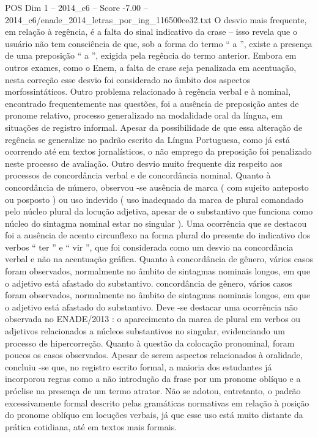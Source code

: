 \begin{textsample}{POS Dim 1 – 2014\_c6 – Score -7.00 – 2014\_c6/enade\_2014\_letras\_por\_ing\_116500ce32.txt}
O desvio mais frequente, em relação à regência, é a falta do sinal indicativo da crase – isso revela que o usuário não tem consciência de que, sob a forma do termo “ a ”, existe a presença de uma preposição “ a ”, exigida pela regência do termo anterior.
Embora em outros exames, como o Enem, a falta de crase seja penalizada em acentuação, nesta correção esse desvio foi considerado no âmbito dos aspectos morfossintáticos.
Outro problema relacionado à regência verbal e à nominal, encontrado frequentemente nas questões, foi a ausência de preposição antes de pronome relativo, processo generalizado na modalidade oral da língua, em situações de registro informal.
Apesar da possibilidade de que essa alteração de regência se generalize no padrão escrito da Língua Portuguesa, como já está ocorrendo até em textos jornalísticos, o não emprego da preposição foi penalizado neste processo de avaliação.
Outro desvio muito frequente diz respeito aos processos de concordância verbal e de concordância nominal.
Quanto à concordância de número, observou -se ausência de marca ( com sujeito anteposto ou posposto ) ou uso indevido ( uso inadequado da marca de plural comandado pelo núcleo plural da locução adjetiva, apesar de o substantivo que funciona como núcleo do sintagma nominal estar no singular ).
Uma ocorrência que se destacou foi a ausência de acento circunflexo na forma plural do presente do indicativo dos verbos “ ter ” e “ vir ”, que foi considerada como um desvio na concordância verbal e não na acentuação gráfica.
Quanto à concordância de gênero, vários casos foram observados, normalmente no âmbito de sintagmas nominais longos, em que o adjetivo está afastado do substantivo. concordância de gênero, vários casos foram observados, normalmente no âmbito de sintagmas nominais longos, em que o adjetivo está afastado do substantivo.
Deve -se destacar uma ocorrência não observada no ENADE/2013 : o aparecimento da marca de plural em verbos ou adjetivos relacionados a núcleos substantivos no singular, evidenciando um processo de hipercorreção.
Quanto à questão da colocação pronominal, foram poucos os casos observados.
Apesar de serem aspectos relacionados à oralidade, concluiu -se que, no registro escrito formal, a maioria dos estudantes já incorporou regras como a não introdução da frase por um pronome oblíquo e a próclise na presença de um termo atrator.
Não se adotou, entretanto, o padrão excessivamente formal descrito pelas gramáticas normativas em relação à posição do pronome oblíquo em locuções verbais, já que esse uso está muito distante da prática cotidiana, até em textos mais formais.

\end{textsample}
